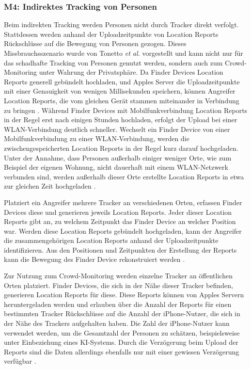 \subsubsection[M4]{M4: Indirektes Tracking von Personen}
\label{missbrauch:4}
Beim indirekten Tracking werden Personen nicht durch Tracker direkt verfolgt.
Stattdessen werden anhand der Uploadzeitpunkte von Location Reports Rückschlüsse auf die Bewegung von Personen gezogen.
Dieses Missbrauchsszenario wurde von Tonetto \textit{et al.} \cite{Tonetto_FindMy} vorgestellt und kann nicht nur für das schadhafte Tracking von Personen genutzt werden, sondern auch zum Crowd-Monitoring unter Wahrung der Privatsphäre.
Da Finder Devices Location Reports generell gebündelt hochladen, und Apples Server die Uploadzeitpunkte mit einer Genauigkeit von wenigen Millisekunden speichern, können Angreifer Location Reports, die vom gleichen Gerät stammen miteinander in Verbindung zu bringen \cite{Tonetto_FindMy}.
Während Finder Devices mit Mobilfunkverbindung Location Reports in der Regel erst nach einigen Stunden hochladen, erfolgt der Upload bei einer WLAN-Verbindung deutlich schneller.
Wechselt ein Finder Device von einer Mobilfunkverbindung zu einer WLAN-Verbindung, werden die zwischengespeicherten Location Reports in der Regel kurz darauf hochgeladen.
Unter der Annahme, dass Personen außerhalb einiger weniger Orte, wie zum Beispiel der eigenen Wohnung, nicht dauerhaft mit einem WLAN-Netzwerk verbunden sind, werden außerhalb dieser Orte erstellte Location Reports in etwa zur gleichen Zeit hochgeladen \cite{Tonetto_FindMy}.

Platziert ein Angreifer mehrere Tracker an verschiedenen Orten, erfassen Finder Devices diese und generieren jeweils Location Reports.
Jeder dieser Location Reports gibt an, zu welchem Zeitpunkt das Finder Device an welcher Position war.
Werden diese Location Reports gebündelt hochgeladen, kann der Angreifer die zusammengehörigen Location Reports anhand der Uploadzeitpunkte identifizieren.
Aus den Positionen und Zeitpunkten der Erstellung der Reports kann die Bewegung des Finder Device rekonstruiert werden \cite{Tonetto_FindMy}.


Zur Nutzung zum Crowd-Monitoring werden einzelne Tracker an öffentlichen Orten platziert.
Finder Devices, die sich in der Nähe dieser Tracker befinden, generieren Location Reports für diese.
Diese Reports können von Apples Servern heruntergeladen werden und erlauben über die Anzahl der Reports für einen bestimmten Tracker Rückschlüsse auf die Anzahl der iPhone-Nutzer, die sich in der Nähe des Trackers aufgehalten haben.
Die Zahl der iPhone-Nutzer kann verwendet werden, um die Gesamtzahl der Personen zu schätzen, beispielsweise unter Einbeziehung eines KI-Systems.
Durch die Verzögerung beim Upload der Reports sind die Daten allerdings ebenfalls nur mit einer gewissen Verzögerung verfügbar \cite{Tonetto_FindMy}.

